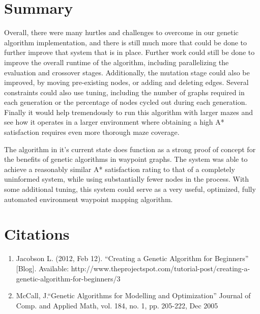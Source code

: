 \section{Summary}
	Overall, there were many hurtles and challenges to overcome in our genetic algorithm implementation, and there is still much more that could be done to further improve that system that is in place. Further work could still be done to improve the overall runtime of the algorithm, including parallelizing the evaluation and crossover stages. Additionally, the mutation stage could also be improved, by moving pre-existing nodes, or adding and deleting edges. Several constraints could also use tuning, including the number of graphs required in each generation or the percentage of nodes cycled out during each generation. Finally it would help tremendously to run this algorithm with larger mazes and see how it operates in a larger environment where obtaining a high A* satisfaction requires even more thorough maze coverage.
	
	The algorithm in it's current state does function as a strong proof of concept for the benefits of genetic algorithms in waypoint graphs. The system was able to achieve a reasonably similar A* satisfaction rating to that of a completely uninformed system, while using substantially fewer nodes in the process. With some additional tuning, this system could serve as a very useful, optimized, fully automated environment waypoint mapping algorithm.


\section{Citations}

\begin{enumerate}
	\item Jacobson L. (2012, Feb 12). “Creating a Genetic Algorithm for Beginners” [Blog]. Available: http://www.theprojectspot.com/tutorial-post/creating-a-genetic-algorithm-for-beginners/3 
	\item McCall, J.“Genetic Algorithms for Modelling and Optimization” Journal of Comp. and Applied Math, vol. 184, no. 1, pp. 205-222, Dec 2005
\end{enumerate}